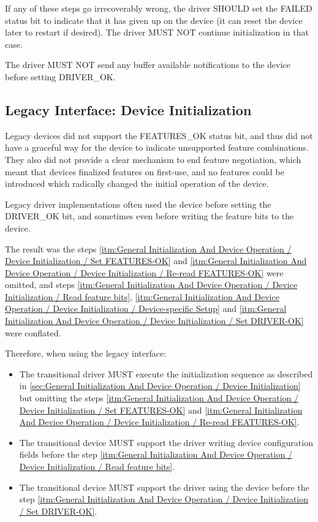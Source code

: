 If any of these steps go irrecoverably wrong, the driver SHOULD
set the FAILED status bit to indicate that it has given up on the
device (it can reset the device later to restart if desired).  The
driver MUST NOT continue initialization in that case.

The driver MUST NOT send any buffer available notifications to
the device before setting DRIVER_OK.

\subsection{Legacy Interface: Device Initialization}\label{sec:General Initialization And Device Operation / Device Initialization / Legacy Interface: Device Initialization}
Legacy devices did not support the FEATURES_OK status bit, and thus did
not have a graceful way for the device to indicate unsupported feature
combinations.  They also did not provide a clear mechanism to end
feature negotiation, which meant that devices finalized features on
first-use, and no features could be introduced which radically changed
the initial operation of the device.

Legacy driver implementations often used the device before setting the
DRIVER_OK bit, and sometimes even before writing the feature bits
to the device.

The result was the steps \ref{itm:General Initialization And
Device Operation / Device Initialization / Set FEATURES-OK} and
\ref{itm:General Initialization And Device Operation / Device
Initialization / Re-read FEATURES-OK} were omitted, and steps
\ref{itm:General Initialization And Device Operation /
Device Initialization / Read feature bits},
\ref{itm:General Initialization And Device Operation / Device Initialization / Device-specific Setup} and \ref{itm:General Initialization And Device Operation / Device Initialization / Set DRIVER-OK}
were conflated.

Therefore, when using the legacy interface:
\begin{itemize}
\item
The transitional driver MUST execute the initialization
sequence as described in \ref{sec:General Initialization And Device
Operation / Device Initialization}
but omitting the steps \ref{itm:General Initialization And Device
Operation / Device Initialization / Set FEATURES-OK} and
\ref{itm:General Initialization And Device Operation / Device
Initialization / Re-read FEATURES-OK}.

\item
The transitional device MUST support the driver
writing device configuration fields
before the step \ref{itm:General Initialization And Device Operation /
Device Initialization / Read feature bits}.
\item
The transitional device MUST support the driver
using the device before the step \ref{itm:General Initialization
And Device Operation / Device Initialization / Set DRIVER-OK}.
\end{itemize}

